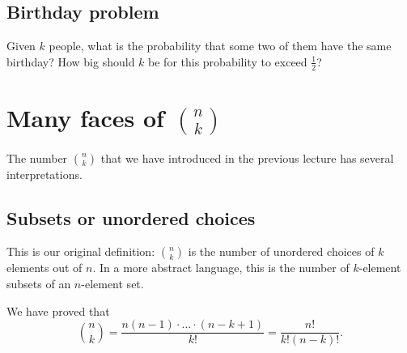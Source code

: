 \subsection{Birthday problem}
Given $k$ people, what is the probability that some two of them have the same birthday?
How big should $k$ be for this probability to exceed $\frac12$?










\section{Many faces of $\binom{n}{k}$}
The number $\binom{n}{k}$ that we have introduced in the previous lecture has several interpretations.
\subsection{Subsets or unordered choices}
This is our original definition: $\binom{n}{k}$ is the number of unordered choices of $k$ elements out of $n$.
In a more abstract language, this is the number of $k$-element subsets of an $n$-element set.

We have proved that
\begin{equation}
\label{eqn:NChooseK}
\binom{n}{k} = \frac{n(n-1)\cdot \ldots \cdot (n-k+1)}{k!} = \frac{n!}{k!(n-k)!}.
\end{equation}
